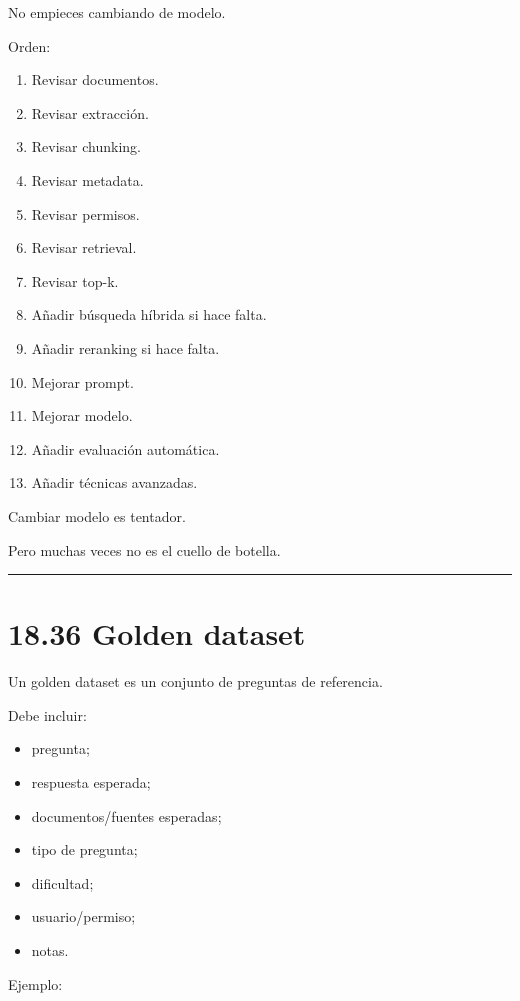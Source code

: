 No empieces cambiando de modelo.

Orden:

\begin{enumerate}
\def\labelenumi{\arabic{enumi}.}
\tightlist
\item
  Revisar documentos.
\item
  Revisar extracción.
\item
  Revisar chunking.
\item
  Revisar metadata.
\item
  Revisar permisos.
\item
  Revisar retrieval.
\item
  Revisar top-k.
\item
  Añadir búsqueda híbrida si hace falta.
\item
  Añadir reranking si hace falta.
\item
  Mejorar prompt.
\item
  Mejorar modelo.
\item
  Añadir evaluación automática.
\item
  Añadir técnicas avanzadas.
\end{enumerate}

Cambiar modelo es tentador.

Pero muchas veces no es el cuello de botella.

\begin{center}\rule{0.5\linewidth}{0.5pt}\end{center}

\section{18.36 Golden dataset}\label{golden-dataset}

Un golden dataset es un conjunto de preguntas de referencia.

Debe incluir:

\begin{itemize}
\tightlist
\item
  pregunta;
\item
  respuesta esperada;
\item
  documentos/fuentes esperadas;
\item
  tipo de pregunta;
\item
  dificultad;
\item
  usuario/permiso;
\item
  notas.
\end{itemize}

Ejemplo:


